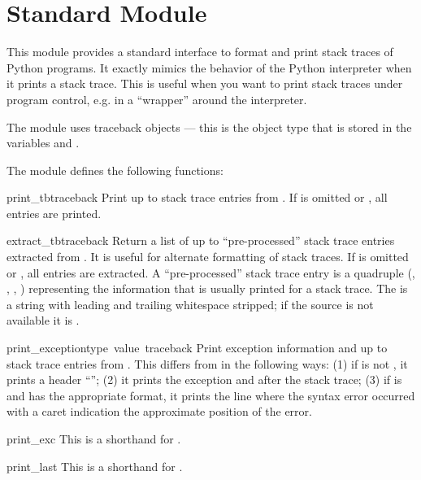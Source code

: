 \section{Standard Module }

\renewcommand{\indexsubitem}{(in module traceback)}

This module provides a standard interface to format and print stack
traces of Python programs.  It exactly mimics the behavior of the
Python interpreter when it prints a stack trace.  This is useful when
you want to print stack traces under program control, e.g. in a
``wrapper'' around the interpreter.

The module uses traceback objects --- this is the object type
that is stored in the variables  and
.

The module defines the following functions:

\begin{funcdesc}{print_tb}{traceback}
Print up to  stack trace entries from .  If
 is omitted or , all entries are printed.
\end{funcdesc}

\begin{funcdesc}{extract_tb}{traceback}
Return a list of up to  ``pre-processed'' stack trace
entries extracted from .  It is useful for alternate
formatting of stack traces.  If  is omitted or ,
all entries are extracted.  A ``pre-processed'' stack trace entry is a
quadruple (, , ,
) representing the information that is usually printed
for a stack trace.  The  is a string with leading and
trailing whitespace stripped; if the source is not available it is
.
\end{funcdesc}

\begin{funcdesc}{print_exception}{type\, value\, traceback}
Print exception information and up to  stack trace entries
from .  This differs from  in the
following ways: (1) if  is not , it prints a
header ``''; (2) it prints the
exception  and  after the stack trace; (3) if
 is  and  has the appropriate
format, it prints the line where the syntax error occurred with a
caret indication the approximate position of the error.
\end{funcdesc}

\begin{funcdesc}{print_exc}{}
This is a shorthand for 
  .
\end{funcdesc}

\begin{funcdesc}{print_last}{}
This is a shorthand for 
  .
\end{funcdesc}
